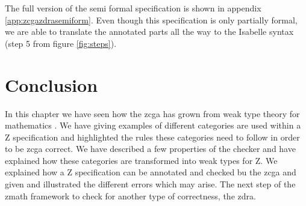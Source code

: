 The full version of the semi formal specification is shown in appendix
\ref{app:zcgazdrasemiform}. Even though this specification is only partially
formal, we are able to translate the annotated parts all the way to the Isabelle
syntax (step 5 from figure \ref{fig:steps}).

\section{Conclusion}
In this chapter we have seen how the \gls{zcga} has grown from weak type theory
for mathematics \cite{wtt}. We have giving examples of different categories are
used within a Z specification and highlighted the rules these categories need to
follow in order to be \gls{zcga} correct. We have described a few properties of
the checker and have explained how these categories are transformed into weak
types for Z. We explained how a Z specification can be annotated and checked bu
the \gls{zcga} and given and illustrated the different errors which may arise.
The next step of the \gls{zmath} framework to check for another type of
correctness, the \gls{zdra}.
